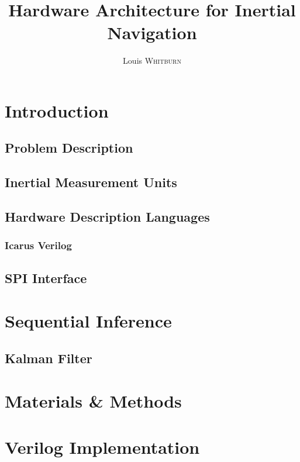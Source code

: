 \documentclass[12pt]{article}
\title{Hardware Architecture for Inertial Navigation}
\author{Louis \textsc{Whitburn}}
\begin{document}
 
    \maketitle

    \tableofcontents
    
    \section{Introduction}
    
        \subsection{Problem Description}
        \subsection{Inertial Measurement Units}
        \subsection{Hardware Description Languages}
    
            \subsubsection{Icarus Verilog}
    
        \subsection {SPI Interface}
        
    \section{Sequential Inference}
    
        \subsection{Kalman Filter}
    
    \section{Materials \& Methods}
    
    \section{Verilog Implementation}
    
\end{document}
